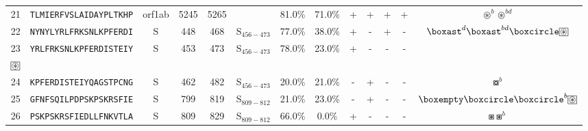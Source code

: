\begin{tabular}{rcccccccccccc}
21 &  \texttt{TLMIERFVSLAIDAYPLTKHP} &  orf1ab &   5245 &  5265 &                &                          81.0\% &                           71.0\% &          + &           + &          + &           + &                                                                                            $ \circledast^b \circledast^{bd} $ \\
22 &  \texttt{NYNYLYRLFRKSNLKPFERDI} &       S &    448 &   468 &  S$_{456-473}$ &                          77.0\% &                           38.0\% &          + &           - &          + &           - &                                         $ \boxast^d \boxast^{bd} \boxcircle \setlength{\fboxsep}{0.5pt} \boxed{\circledast} $ \\
23 &  \texttt{YRLFRKSNLKPFERDISTEIY} &       S &    453 &   473 &  S$_{456-473}$ &                          78.0\% &                           23.0\% &          + &           - &          - &           - &               \Centerstack{  $\boxempty \boxast \boxast^b \boxcircle$ \\  $\setlength{\fboxsep}{0.5pt} \boxed{\circledast}$ } \\
24 &  \texttt{KPFERDISTEIYQAGSTPCNG} &       S &    462 &   482 &  S$_{456-473}$ &                          20.0\% &                           21.0\% &          - &           + &          - &           - &                                                                                                              $ \boxcircle^b $ \\
25 &  \texttt{GFNFSQILPDPSKPSKRSFIE} &       S &    799 &   819 &  S$_{809-812}$ &                          21.0\% &                           23.0\% &          - &           + &          - &           - &                                         $ \boxempty \boxcircle \boxcircle^b \setlength{\fboxsep}{0.5pt} \boxed{\circledast} $ \\
26 &  \texttt{PSKPSKRSFIEDLLFNKVTLA} &       S &    809 &   829 &  S$_{809-812}$ &                          66.0\% &                            0.0\% &          + &           - &          - &           - &                                                                                                         $ \boxast \boxast^b $ \\
\bottomrule
\end{tabular}
